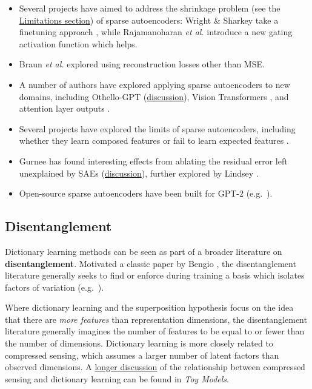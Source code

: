 \documentclass{article}
\let\oldsubsection\subsection
\renewcommand{\subsection}{\FloatBarrier\oldsubsection}
\begin{document}
\begin{itemize}
    \item Several projects have aimed to address the shrinkage problem (see the \hyperref[sec:discussion-limitations]{Limitations section}) of sparse autoencoders: Wright \& Sharkey take a finetuning approach \cite{wright2024suppression}, while Rajamanoharan \textit{et al.} \cite{rajamanoharan2024improving} introduce a new gating activation function which helps.
    \item Braun \textit{et al.} \cite{braunE2E2024} explored using reconstruction losses other than MSE.
    \item A number of authors have explored applying sparse autoencoders to new domains, including Othello-GPT \cite{he2024dictionary,aizi2024only} (\href{https://transformer-circuits.pub/2024/march-update/index.html\#external-othello}{discussion}), Vision Transformers \cite{fry2024vision}, and attention layer outputs \cite{kissane2024attention}.
    \item Several projects have explored the limits of sparse autoencoders, including whether they learn composed features \cite{till2024true,anders2024composed} or fail to learn expected features \cite{aizi2024only}.
    \item Gurnee has found interesting effects from ablating the residual error left unexplained by SAEs \cite{gurnee2024pathological} (\href{https://transformer-circuits.pub/2024/april-update/index.html\#external-sae-errors}{discussion}), further explored by Lindsey \cite{lindsey2024how}.
    \item Open-source sparse autoencoders have been built for GPT-2 (e.g.~\cite{openai2024debugger,bloom2024open}).
\end{itemize}

\subsection{Disentanglement}\label{sec:related-work-disentanglement}

Dictionary learning methods can be seen as part of a broader literature on \textbf{disentanglement}. Motivated a classic paper by Bengio \cite{bengio2013representation}, the disentanglement literature generally seeks to find or enforce during training a basis which isolates factors of variation (e.g.~\cite{higgins2016beta,chen2016infogan,kim2018disentangling}).

Where dictionary learning and the superposition hypothesis focus on the idea that there are \textit{more features} than representation dimensions, the disentanglement literature generally imagines the number of features to be equal to or fewer than the number of dimensions. Dictionary learning is more closely related to compressed sensing, which assumes a larger number of latent factors than observed dimensions. A \href{https://transformer-circuits.pub/2022/toy_model/index.html\#related-disentanglement}{longer discussion} of the relationship between compressed sensing and dictionary learning can be found in \textit{Toy Models}.
\end{document}
